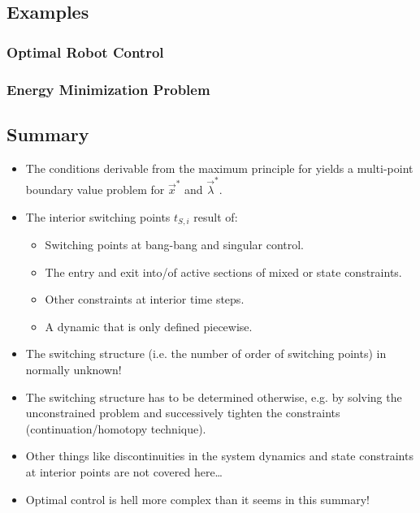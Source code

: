 		\subsection{Examples} %

			\subsubsection{Optimal Robot Control} %

			\subsubsection{Energy Minimization Problem} %

		\subsection{Summary}
			\begin{itemize}
				\item The conditions derivable from the maximum principle for yields a multi-point boundary value problem for \(\vec{x}^\ast\) and \(\vec{\lambda}^\ast\).
				\item The interior switching points \( t_{S, i} \) result of:
					\begin{itemize}
						\item Switching points at bang-bang and singular control.
						\item The entry and exit into/of active sections of mixed or state constraints.
						\item Other constraints at interior time steps.
						\item A dynamic that is only defined piecewise.
					\end{itemize}
				\item The switching structure (i.e. the number of order of switching points) in normally unknown!
				\item The switching structure has to be determined otherwise, e.g. by solving the unconstrained problem and successively tighten the constraints (continuation/homotopy technique).
				\item Other things like discontinuities in the system dynamics and state constraints at interior points are not covered here\dots
				\item Optimal control is hell more complex than it seems in this summary!
			\end{itemize}

